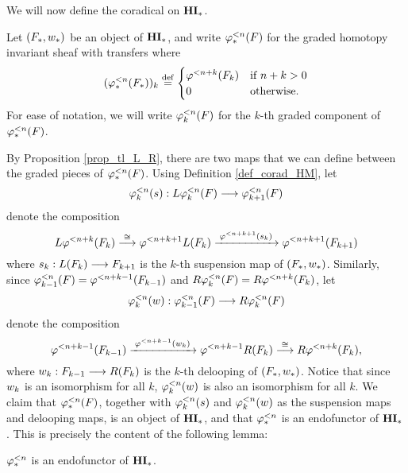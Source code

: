 We will now define the coradical on $\HM$. 

\begin{defn}\label{def_corad_HM}
Let $(F_*, \deloop_*)$ 
be an object of $\HM$, and write $\tlHM{n}(F)$ for the graded 
homotopy invariant sheaf with transfers where
\[
(\tlHM{n}(F_*))_k \defeq
\begin{cases}
   \tlHI{n + k}(F_k) & \textrm{if } n + k > 0 \\
   0                 & \textrm{otherwise}.
\end{cases}
\]
For ease of notation, we will write $\tlHM[k]{n}(F)$ for the 
$k$-th graded component of $\tlHM{n}(F)$.
\end{defn}

By Proposition \ref{prop_tl_L_R}, there are two maps that we can
define between the graded pieces of $\tlHM{n}(F)$. Using Definition
\ref{def_corad_HM}, let
\[
\suspTL[k]{n} : L\tlHM[k]{n}(F) \to \tlHM[k + 1]{n}(F)
\]
denote the composition
\begin{equation}\label{eq_susp_def}
L \tlHI{n + k}(F_k) \stackrel{\cong}{\to} 
   \tlHI{n + k + 1}L(F_k) 
   \xrightarrow{\;\tlHI{n + k + 1}(\susp_k)\;} 
   \tlHI{n + k + 1}(F_{k + 1})
\end{equation}
where $\susp_k: L(F_k) \to F_{k + 1}$ is the $k$-th suspension 
map of $(F_*, \deloop_*)$. Similarly, since $\tlHM[k - 1]{n}(F) = 
\tlHI{n + k - 1}(F_{k - 1})$ and $R \tlHM[k]{n}(F) = 
R\tlHI{n + k}(F_{k})$, let
\[
\deloopTL[k]{n} : \tlHM[k - 1]{n}(F) \to R \tlHM[k]{n}(F) 
\]
denote the composition
\begin{equation}\label{eq_deloop_def}
\tlHI{n + k - 1}(F_{k - 1})
   \xrightarrow{\;\tlHI{n + k - 1}(\deloop_k)\;} 
   \tlHI{n + k - 1} R(F_k) \stackrel{\cong}{\to} 
   R \tlHI{n + k}(F_k),
\end{equation}
where $\deloop_k: F_{k - 1} \to R(F_k)$ is the $k$-th delooping
of $(F_*, \deloop_*)$. Notice that since $\deloop_k$ is an isomorphism 
for all $k$, $\deloopTL[k]{n}$ is also an isomorphism for 
all $k$. We claim that $\tlHM{n}(F)$, together with $\suspTL[k]{n}$ and
$\deloopTL[k]{n}$ as the suspension maps and delooping maps,
is an object of $\HM$, and that $\tlHM{n}$ is an endofunctor of $\HM$.
This is precisely the content of the following lemma:

\begin{lem}\label{lem_tlHM_is_functor}
$\tlHM{n}$ is an endofunctor of $\HM$.
\end{lem}

